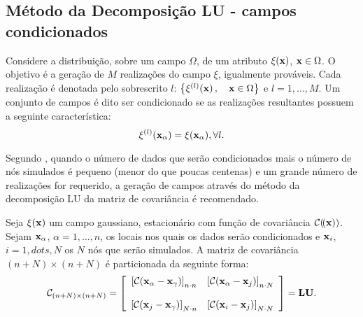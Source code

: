\documentclass[12pt,a4paper,portuges]{article}
\newcommand{\cpy}{\xi}
\begin{document}
\subsection{Método da Decomposição LU - campos condicionados}
Considere a distribuição, sobre um campo $\Omega$, de um atributo $\cpy\fx$, $\mathbf{x} \in \Omega$. O
objetivo é a geração de $M$ realizações do campo $\cpy$, igualmente prováveis. Cada realização é
denotada pelo sobrescrito $l$: $\left\{\cpy^{(l)}\fx,\quad\vx \in \Omega\right\}$ e $l=1,\dots,M$.
Um conjunto de campos é dito ser condicionado se as realizações resultantes possuem a seguinte
característica:
\begin{equation}
   \cpy^{(l)}(\vx_{\alpha}) = \cpy(\vx_{\alpha}), \forall l.
\end{equation}

Segundo \cite{deutsch92}, quando o número de dados que serão condicionados mais o número de nós
simulados é pequeno (menor do que poucas centenas) e um grande número de realizações for requerido,
a geração de campos através do método da decomposição LU da matriz de covariância é recomendado.

Seja $\cpy\fx$ um campo gaussiano, estacionário com função de covariância $\mathcal{C}_{}(\!\left(\mathbf{x}\right))$. Sejam
$\mathbf{x}_{\alpha}$, $\alpha =1,\dots,n$, os locais nos quais os dados serão condicionados e $\mathbf{x}_{i}$,
$i=1,dots,N$ os $N$ nós que serão simulados. A matriz de covariância $(n+N)\times (n+N)$ é
particionada da seguinte forma:
\begin{equation}
   \mathcal{C}_{(n+N)\times (n+N)}=\left[
   \begin{array}{cc}
      \left[ \mathcal{C}_{}(\mathbf{x}_{\alpha}-\mathbf{x}_{\gamma})\right]_{n\cdot n} & \left[
\mathcal{C}_{}(\mathbf{x}_{\alpha}-\mathbf{x}_{j})\right]_{n\cdot N} \\ \\
      \left[ \mathcal{C}_{}(\mathbf{x}_{j}-\mathbf{x}_{\gamma})\right]_{N\cdot n} & \left[
\mathcal{C}_{}(\mathbf{x}_{i}-\mathbf{x}_{j})\right]_{N\cdot N} 
   \end{array}
   \right] = \mathbf{LU}.
\end{equation}
\end{document}
